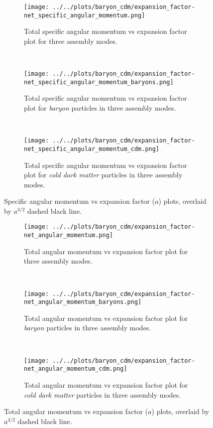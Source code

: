 \documentclass{article}
\begin{document}
	\begin{figure}
		\centering
		\begin{subfigure} {\columnwidth}
				\centering 
				\texttt{[image: ../../plots/baryon\_cdm/expansion\_factor-net\_specific\_angular\_momentum.png]}
				\caption{Total specific angular momentum vs expansion factor plot for three assembly modes.}
		\end{subfigure} \\
			\vspace{1cm}
		\begin{subfigure} {\columnwidth}
				\centering 
				\texttt{[image: ../../plots/baryon\_cdm/expansion\_factor-net\_specific\_angular\_momentum\_baryons.png]}
				\caption{Total specific angular momentum vs expansion factor plot for \emph{baryon }particles in three assembly modes.}
		\end{subfigure} \\
			\vspace{1cm}
		\begin{subfigure} {\columnwidth}
				\centering 
				\texttt{[image: ../../plots/baryon\_cdm/expansion\_factor-net\_specific\_angular\_momentum\_cdm.png]}
				\caption{Total specific angular momentum vs expansion factor plot for \emph{cold dark matter} particles in three assembly modes.}
		\end{subfigure}
		\caption{Specific angular momentum vs expansion factor (\(a\)) plots, overlaid by \(a^{3/2}\) dashed black line.}
	\end{figure}

	\clearpage

	\begin{figure}
		\centering
		\begin{subfigure} {\columnwidth}
				\centering 
				\texttt{[image: ../../plots/baryon\_cdm/expansion\_factor-net\_angular\_momentum.png]}
				\caption{Total angular momentum vs expansion factor plot for three assembly modes.}
		\end{subfigure} \\
			\vspace{1cm}
		\begin{subfigure} {\columnwidth}
				\centering 
				\texttt{[image: ../../plots/baryon\_cdm/expansion\_factor-net\_angular\_momentum\_baryons.png]}
				\caption{Total angular momentum vs expansion factor plot for \emph{baryon }particles in three assembly modes.}
		\end{subfigure} \\
			\vspace{1cm}
		\begin{subfigure} {\columnwidth}
				\centering 
				\texttt{[image: ../../plots/baryon\_cdm/expansion\_factor-net\_angular\_momentum\_cdm.png]}
				\caption{Total angular momentum vs expansion factor plot for \emph{cold dark matter} particles in three assembly modes.}
		\end{subfigure}
		\caption{Total angular momentum vs expansion factor (\(a\)) plots, overlaid by \(a^{3/2}\) dashed black line.}
	\end{figure}
\end{document}
